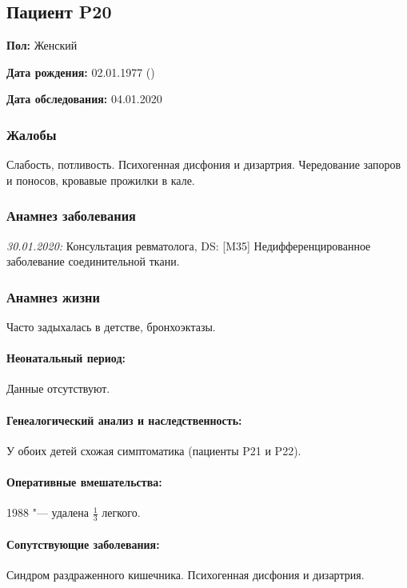 \documentclass[a4paper,14pt]{extarticle}
\newcommand{\pdate}[1]{\emph{#1:} }
\newcommand{\DS}[2]{[#2] #1}
\begin{document}
\newpage
\subsection*{Пациент P20}

\textbf{Пол:} Женский

\textbf{Дата рождения:} 02.01.1977 ()

\textbf{Дата обследования:} 04.01.2020

\subsubsection*{Жалобы}

Слабость, потливость. Психогенная дисфония и дизартрия. Чередование запоров и поносов, кровавые прожилки в кале.

\subsubsection*{Анамнез заболевания}

\pdate{30.01.2020} Консультация ревматолога, DS: \DS{Недифференцированное заболевание соединительной ткани}{M35}.

\subsubsection*{Анамнез жизни}

Часто задыхалась в детстве, бронхоэктазы.

\paragraph{Неонатальный период:} Данные отсутствуют.

\paragraph{Генеалогический анализ и наследственность:} У обоих детей схожая симптоматика (пациенты P21 и P22).

\paragraph{Оперативные вмешательства:} 1988 "--- удалена $\frac{1}{3}$ легкого.

\paragraph{Сопутствующие заболевания:} Синдром раздраженного кишечника. Психогенная дисфония и дизартрия.
\end{document}
